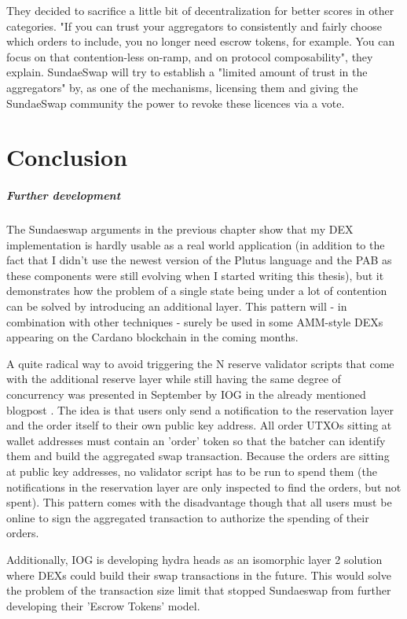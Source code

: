 \documentclass[a4paper,twoside,12pt]{report}
\begin{document}
They decided to sacrifice a little bit of decentralization for better scores in other categories. "If you can trust your aggregators to consistently and fairly choose which orders to include, you no longer need escrow tokens, for example. You can focus on that contention-less on-ramp, and on protocol composability", they explain. SundaeSwap will try to establish a "limited amount of trust in the aggregators" by, as one of the mechanisms, licensing them and giving the SundaeSwap community the power to revoke these licences via a vote.

\chapter{Conclusion}

\paragraph{Further development} The Sundaeswap arguments in the previous chapter show that my DEX implementation is hardly usable as a real world application (in addition to the fact that I didn't use the newest version of the Plutus language and the PAB as these components were still evolving when I started writing this thesis), but it demonstrates how the problem of a single state being under a lot of contention can be solved by introducing an additional layer. This pattern will - in combination with other techniques - surely be used in some AMM-style DEXs appearing on the Cardano blockchain in the coming months.

A quite radical way to avoid triggering the N reserve validator scripts that come with the additional reserve layer while still having the same degree of concurrency was presented in September by IOG in the already mentioned blogpost \cite{iogDesignPattern}. The idea is that users only send a notification to the reservation layer and the order itself to their own public key address. All order UTXOs sitting at wallet addresses must contain an 'order’ token so that the batcher can identify them and build the aggregated swap transaction. Because the orders are sitting at public key addresses, no validator script has to be run to spend them (the notifications in the reservation layer are only inspected to find the orders, but not spent). This pattern comes with the disadvantage though that all users must be online to sign the aggregated transaction to authorize the spending of their orders. 

Additionally, IOG is developing hydra heads \cite{iogHydra} as an isomorphic layer 2 solution where DEXs could build their swap transactions in the future. This would solve the problem of the transaction size limit that stopped Sundaeswap from further developing their 'Escrow Tokens' model.
\end{document}
